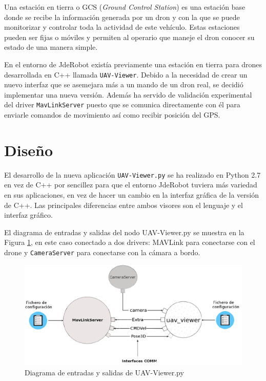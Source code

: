 \label{visor uavViewer}

Una estación en tierra o GCS (\textit{Ground Control Station}) es una estación base donde se recibe la
información generada por un dron y con la que se puede monitorizar y controlar toda la actividad
de este vehículo. Estas estaciones pueden ser fijas o móviles y permiten al operario que maneje el dron
conocer su estado de una manera simple.

En el entorno de JdeRobot existía previamente una estación en tierra para drones desarrollada en C++ llamada \texttt{UAV-Viewer}. Debido a la necesidad de crear un nuevo interfaz que se asemejara más a un mando de un dron real, se decidió implementar una nueva versión. Además ha servido de validación experimental del driver \texttt{MavLinkServer} puesto que se comunica directamente con él para enviarle comandos de movimiento así como recibir posición del GPS.

\section{Diseño}

El desarrollo de la nueva aplicación \texttt{UAV-Viewer.py} se ha realizado en Python 2.7 en vez de C++ por sencillez para que el entorno JdeRobot tuviera más variedad en sus aplicaciones, en vez de hacer un cambio en la interfaz gráfica de la versión de C++. Las principales diferencias entre ambos visores son el lenguaje y el interfaz gráfico. 

El diagrama de entradas y salidas del nodo UAV-Viewer.py se muestra en la Figura \ref{fig:esquemaUav}, en este caso
conectado a dos drivers: MAVLink para conectarse con el drone y \texttt{CameraServer} para conectarse con
la cámara a bordo.

\begin{figure}[H]
  \centering
  \includegraphics[scale=0.4]{imagenes/MapaGeneral.png}
  \caption{Diagrama de entradas y salidas de UAV-Viewer.py}
  \label{fig:esquemaUav}
\end{figure}

